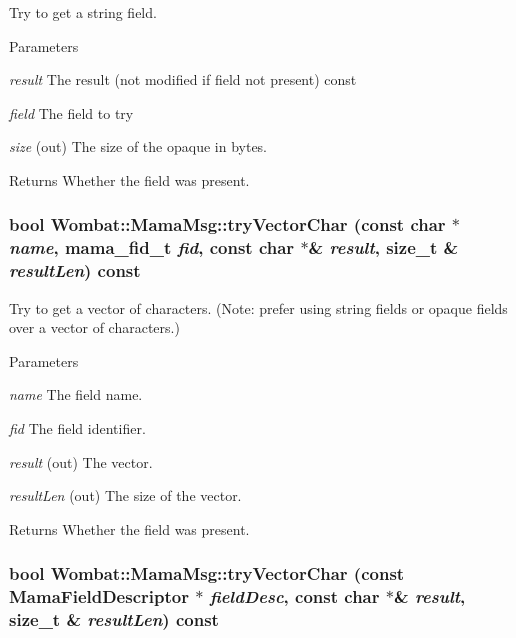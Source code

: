 Try to get a string field. 
\begin{DoxyParams}{Parameters}
\item[{\em result}]The result (not modified if field not present) const \item[{\em field}]The field to try \item[{\em size}](out) The size of the opaque in bytes. \end{DoxyParams}
\begin{DoxyReturn}{Returns}
Whether the field was present. 
\end{DoxyReturn}
\hypertarget{classWombat_1_1MamaMsg_aa4dab0b345136998178c87c2f073d3ff}{
\subsubsection[{tryVectorChar}]{\setlength{\rightskip}{0pt plus 5cm}bool Wombat::MamaMsg::tryVectorChar (const char $\ast$ {\em name}, \/  mama\_\-fid\_\-t {\em fid}, \/  const char $\ast$\& {\em result}, \/  size\_\-t \& {\em resultLen}) const}}
\label{classWombat_1_1MamaMsg_aa4dab0b345136998178c87c2f073d3ff}


Try to get a vector of characters. (Note: prefer using string fields or opaque fields over a vector of characters.) 
\begin{DoxyParams}{Parameters}
\item[{\em name}]The field name. \item[{\em fid}]The field identifier. \item[{\em result}](out) The vector. \item[{\em resultLen}](out) The size of the vector. \end{DoxyParams}
\begin{DoxyReturn}{Returns}
Whether the field was present. 
\end{DoxyReturn}
\hypertarget{classWombat_1_1MamaMsg_a8f72e7c6ded3298d4129d9d77fb7ff40}{
\subsubsection[{tryVectorChar}]{\setlength{\rightskip}{0pt plus 5cm}bool Wombat::MamaMsg::tryVectorChar (const {\bf MamaFieldDescriptor} $\ast$ {\em fieldDesc}, \/  const char $\ast$\& {\em result}, \/  size\_\-t \& {\em resultLen}) const}}
\label{classWombat_1_1MamaMsg_a8f72e7c6ded3298d4129d9d77fb7ff40}


